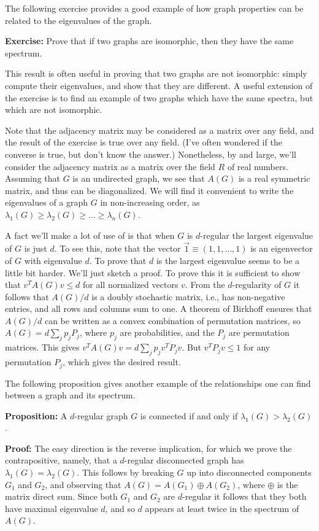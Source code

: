 \documentclass[12pt]{article}
\begin{document}
The following exercise provides a good example of how graph properties
can be related to the eigenvalues of the graph.

\textbf{Exercise:} Prove that if two graphs are isomorphic, then they
have the same spectrum.

This result is often useful in proving that two graphs are not
isomorphic: simply compute their eigenvalues, and show that they are
different.  A useful extension of the exercise is to find an example
of two graphs which have the same spectra, but which are not
isomorphic.

Note that the adjacency matrix may be considered as a matrix over any
field, and the result of the exercise is true over any field.  (I've
often wondered if the converse is true, but don't know the answer.)
Nonetheless, by and large, we'll consider the adjacency matrix as a
matrix over the field $R$ of real numbers.  Assuming that $G$ is an
undirected graph, we see that $A(G)$ is a real symmetric matrix, and
thus can be diagonalized.  We will find it convenient to write the
eigenvalues of a graph $G$ in non-increasing order, as $\lambda_1(G)
\geq \lambda_2(G) \geq \ldots \geq \lambda_n(G)$.  

A fact we'll make a lot of use of is that when $G$ is $d$-regular the
largest eigenvalue of $G$ is just $d$.  To see this, note that the
vector $\vec 1 \equiv (1,1,\ldots,1)$ is an eigenvector of $G$ with
eigenvalue $d$.  To prove that $d$ is the largest eigenvalue seems to
be a little bit harder.  We'll just sketch a proof.  To prove this it
is sufficient to show that $v^T A(G) v \leq d$ for all normalized
vectors $v$.  From the $d$-regularity of $G$ it follows that $A(G)/d$
is a doubly stochastic matrix, i.e., has non-negative entries, and all
rows and columns sum to one.  A theorem of Birkhoff ensures that
$A(G)/d$ can be written as a convex combination of permutation
matrices, so $A(G) = d \sum_j p_j P_j$, where $p_j$ are probabilities,
and the $P_j$ are permutation matrices.  This gives $v^T A(G) v = d
\sum_j p_j v^T P_j v$.  But $v^T P_j v \leq 1$ for any permutation
$P_j$, which gives the desired result.

The following proposition gives another example of the relationships
one can find between a graph and its spectrum.

\textbf{Proposition:} A $d$-regular graph $G$ is connected if and only
if $\lambda_1(G) > \lambda_2(G)$.

\textbf{Proof:} The easy direction is the reverse implication, for
which we prove the contrapositive, namely, that a $d$-regular
disconnected graph has $\lambda_1(G) = \lambda_2(G)$.  This follows by
breaking $G$ up into disconnected components $G_1$ and $G_2$, and
observing that $A(G) = A(G_1) \oplus A(G_2)$, where $\oplus$ is the
matrix direct sum.  Since both $G_1$ and $G_2$ are $d$-regular it
follows that they both have maximal eigenvalue $d$, and so $d$ appears
at least twice in the spectrum of $A(G)$.
\end{document}
